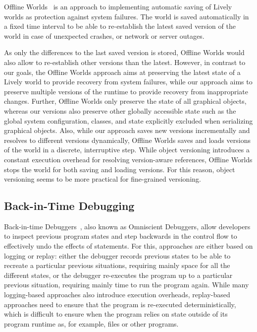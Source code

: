Offline Worlds~\cite{Czuchra2012OfW} is an approach to implementing automatic saving of Lively worlds as protection against system failures.
The world is saved automatically in a fixed time interval to be able to re-establish the latest saved version of the world in case of unexpected crashes, or network or server outages.

As only the differences to the last saved version is stored, Offline Worlds would also allow to re-establish other versions than the latest.
However, in contrast to our goals, the Offline Worlds approach aims at preserving the latest state of a Lively world to provide recovery from system failures, while our approach aims to preserve multiple versions of the runtime to provide recovery from inappropriate changes.
Further, Offline Worlds only preserve the state of all graphical objects, whereas our versions also preserve other globally accessible state such as the global system configuration, classes, and state explicitly excluded when serializing graphical objects.
Also, while our approach saves new versions incrementally and resolves to different versions dynamically, Offline Worlds saves and loads versions of the world in a discrete, interruptive step.
While object versioning introduces a constant execution overhead for resolving version-aware references, Offline Worlds stops the world for both saving and loading versions.
For this reason, object versioning seems to be more practical for fine-grained versioning.



\subsection{Back-in-Time Debugging}

Back-in-time Debuggers~\cite{Lewis2003BIT}, also known as Omniscient Debuggers, allow developers to inspect previous program states and step backwards in the control flow to effectively undo the effects of statements.
For this, approaches are either based on logging or replay: either the debugger records previous states to be able to recreate a particular previous situations, requiring mainly space for all the different states, or the debugger re-executes the program up to a particular previous situation, requiring mainly time to run the program again.
While many logging-based approaches also introduce execution overheads, replay-based approaches need to ensure that the program is re-executed deterministically, which is difficult to ensure when the program relies on state outside of its program runtime as, for example, files or other programs.

